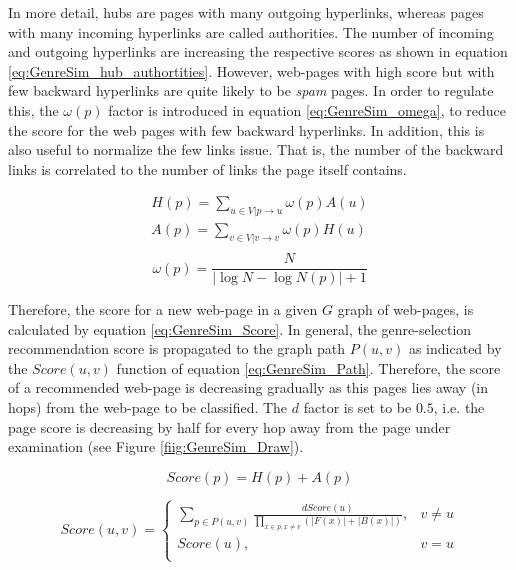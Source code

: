 In more detail, hubs are pages with many outgoing hyperlinks, whereas pages with many incoming hyperlinks are called authorities. The number of incoming and outgoing hyperlinks are increasing the respective scores as shown in equation \ref{eq:GenreSim_hub_authortities}. However, web-pages with high score but with few backward hyperlinks are quite likely to be \textit{spam} pages. In order to regulate this, the $\omega(p)$ factor is introduced in equation \ref{eq:GenreSim_omega}, to reduce the score for the web pages with few backward hyperlinks. In addition, this is also useful to normalize the few links issue. That is, the number of the backward links is correlated to the number of links the page itself contains. 

\begin{equation}\label{eq:GenreSim_hub_authortities}
	\begin{array}{l}
		H(p) = \sum_{u \in V|p \to u} \omega(p) A(u) \\  
    	A(p) = \sum_{v \in V|v \to v} \omega(p) H(u) \\
    \end{array}
\end{equation}
\begin{equation}\label{eq:GenreSim_omega}
	\omega(p) = \frac{N}{|\log N - \log N(p) | + 1} 
\end{equation}

Therefore, the score for a new web-page in a given $G$ graph of web-pages, is calculated by equation \ref{eq:GenreSim_Score}. In general, the genre-selection recommendation score is propagated to the graph path $P(u,v)$ as indicated by the $Score(u, v)$ function of equation \ref{eq:GenreSim_Path}. Therefore, the score of a recommended web-page is decreasing gradually as this pages lies away (in hops) from the web-page to be classified. The $d$ factor is set to be $0.5$, i.e. the page score is decreasing by half for every hop away from the page under examination (see Figure \ref{fiig:GenreSim_Draw}). 

\begin{equation}\label{eq:GenreSim_Score}
	Score(p) = H(p) + A(p)
\end{equation}

\begin{equation}\label{eq:GenreSim_Path}
	Score(u, v) =
      \begin{cases}
      	\sum_{p \in P(u, v)} \frac{d Score(u)}{\prod_{x \in p, x  \neq v} (|F(x)| +|B(x)|)}, & v \neq u \\
        Score(u), & v = u \\ 
       \end{cases}
\end{equation}

